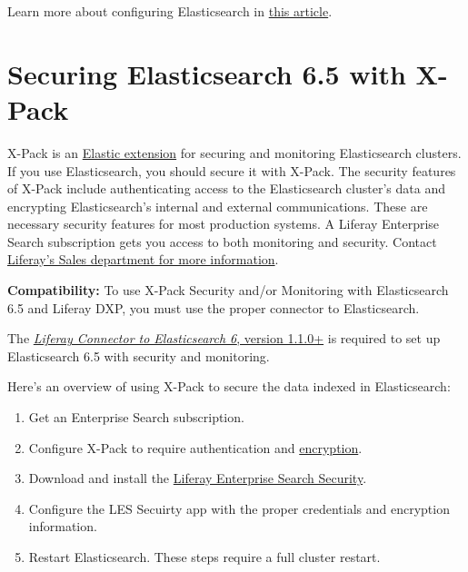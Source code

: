 Learn more about configuring Elasticsearch in
\href{/docs/7-0/deploy/-/knowledge_base/d/configuring-elasticsearch-for-liferay-0}{this
article}.

\section{Securing Elasticsearch 6.5 with
X-Pack}\label{securing-elasticsearch-6.5-with-x-pack}

X-Pack is an
\href{https://www.elastic.co/guide/en/elasticsearch/reference/6.5/setup-xpack.html}{Elastic
extension} for securing and monitoring Elasticsearch clusters. If you
use Elasticsearch, you should secure it with X-Pack. The security
features of X-Pack include authenticating access to the Elasticsearch
cluster's data and encrypting Elasticsearch's internal and external
communications. These are necessary security features for most
production systems. A Liferay Enterprise Search subscription gets you
access to both monitoring and security. Contact
\href{https://www.liferay.com/contact-us\#contact-sales}{Liferay's Sales
department for more information}.

\noindent\hrulefill

\textbf{Compatibility:} To use X-Pack Security and/or Monitoring with
Elasticsearch 6.5 and Liferay DXP, you must use the proper connector to
Elasticsearch.

The
\href{https://customer.liferay.com/downloads?p_p_id=com_liferay_osb_customer_downloads_display_web_DownloadsDisplayPortlet&_com_liferay_osb_customer_downloads_display_web_DownloadsDisplayPortlet_productAssetCategoryId=118191013&_com_liferay_osb_customer_downloads_display_web_DownloadsDisplayPortlet_fileTypeAssetCategoryId=118191060}{\emph{Liferay
Connector to Elasticsearch 6}, version 1.1.0+} is required to set up
Elasticsearch 6.5 with security and monitoring.

\noindent\hrulefill

Here's an overview of using X-Pack to secure the data indexed in
Elasticsearch:

\begin{enumerate}
\def\labelenumi{\arabic{enumi}.}
\item
  Get an Enterprise Search subscription.
\item
  Configure X-Pack to require authentication and
  \href{https://www.elastic.co/guide/en/elasticsearch/reference/6.5/configuring-tls.html\#configuring-tls}{encryption}.
\item
  Download and install the
  \href{https://web.liferay.com/group/customer/dxp/downloads/enterprise-search}{Liferay
  Enterprise Search Security}.
\item
  Configure the LES Secuirty app with the proper credentials and
  encryption information.
\item
  Restart Elasticsearch. These steps require a full cluster restart.
\end{enumerate}

